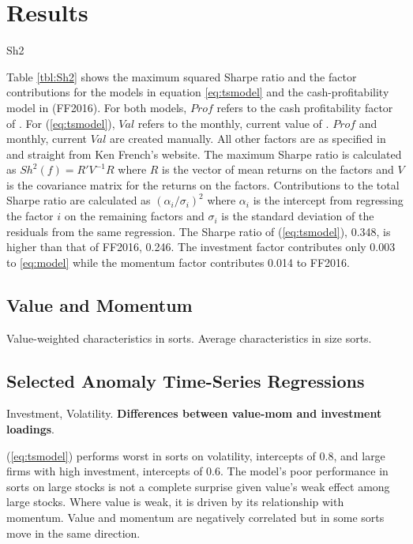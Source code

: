 
\section{Results} \label{sec:results}

{Sh2}

Table \ref{tbl:Sh2} shows the maximum squared Sharpe ratio and the factor contributions for 
the models in equation \ref{eq:tsmodel} and the cash-profitability model in 
\textcite{fama2016choosing} (FF2016).
For both models, $Prof$ refers to the cash profitability factor of \textcite{ball2016accruals}.
For (\ref{eq:tsmodel}), $Val$ refers to the monthly, current value of 
\textcite{asness2013devil}.
$Prof$ and monthly, current $Val$ are created manually.
All other factors are as specified in \textcite{fama2016dissecting} and straight from Ken 
French's 
website.
The maximum Sharpe ratio is calculated as $Sh^2(f)=R'V^{-1}R$ where $R$ is the vector of mean 
returns on the factors and $V$ is the covariance matrix for the returns on the factors.
Contributions to the total Sharpe ratio are calculated as $(\alpha_i / \sigma_i)^2$ where 
$\alpha_i$ is the intercept from regressing the factor $i$ on the remaining factors and 
$\sigma_i$ is the standard deviation of the residuals from the same regression.
The Sharpe ratio of (\ref{eq:tsmodel}), 0.348, is higher than that of FF2016, 0.246.
The investment factor contributes only 0.003 to \ref{eq:model} while the momentum factor 
contributes 0.014 to FF2016.

\subsection{Value and Momentum}

Value-weighted characteristics in sorts.
Average characteristics in size sorts.

\subsection{Selected Anomaly Time-Series Regressions}

Investment, Volatility. \textbf{Differences between value-mom and investment loadings}.

(\ref{eq:tsmodel}) performs worst in sorts on volatility, intercepts of 0.8, and large firms 
with high investment, intercepts of 0.6.
The model's poor performance in sorts on large stocks is not a complete surprise given value's 
weak effect among large stocks.
Where value is weak, it is driven by its relationship with momentum.
Value and momentum are negatively correlated but in some sorts move in the same direction.
